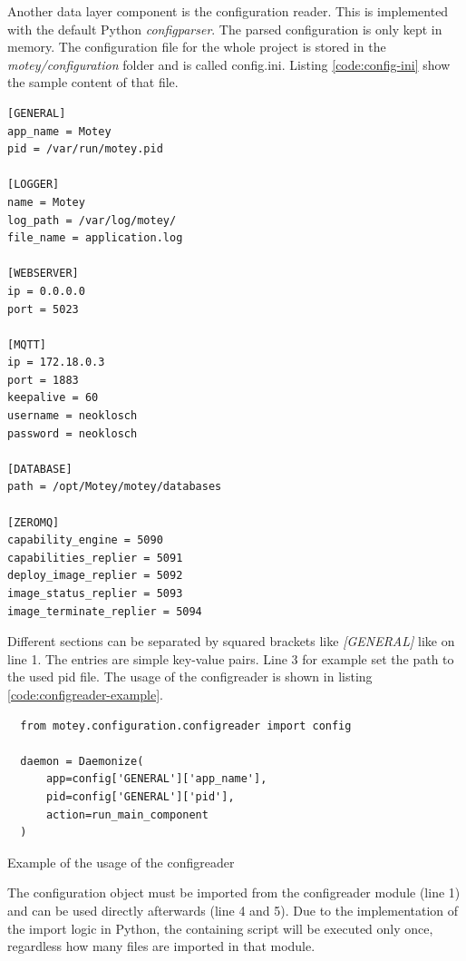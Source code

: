 Another data layer component is the configuration reader.
This is implemented with the default Python \textit{configparser}.
The parsed configuration is only kept in memory.
The configuration file for the whole project is stored in the \textit{motey/configuration} folder and is called config.ini.
Listing \ref{code:config-ini} show the sample content of that file.
\begin{verbatim}
[GENERAL]
app_name = Motey
pid = /var/run/motey.pid

[LOGGER]
name = Motey
log_path = /var/log/motey/
file_name = application.log

[WEBSERVER]
ip = 0.0.0.0
port = 5023

[MQTT]
ip = 172.18.0.3
port = 1883
keepalive = 60
username = neoklosch
password = neoklosch

[DATABASE]
path = /opt/Motey/motey/databases

[ZEROMQ]
capability_engine = 5090
capabilities_replier = 5091
deploy_image_replier = 5092
image_status_replier = 5093
image_terminate_replier = 5094
\end{verbatim}
\vspace{0.5cm}
Different sections can be separated by squared brackets like \textit{[GENERAL]} like on line 1.
The entries are simple key-value pairs.
Line 3 for example set the path to the used pid file.
The usage of the configreader is shown in listing \ref{code:configreader-example}.

\begin{listing}[H]
  \begin{verbatim}
  from motey.configuration.configreader import config

  daemon = Daemonize(
      app=config['GENERAL']['app_name'],
      pid=config['GENERAL']['pid'],
      action=run_main_component
  )
  \end{verbatim}
  \caption{Example of the usage of the configreader}
  \label{code:configreader-example}
\end{listing}
The configuration object must be imported from the configreader module (line 1) and can be used directly afterwards (line 4 and 5).
Due to the implementation of the import logic in Python, the containing script will be executed only once, regardless how many files are imported in that module.

